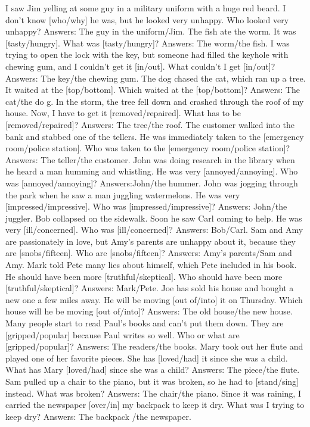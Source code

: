 \begin{foo}
I saw Jim yelling at some guy in a military uniform with a huge red beard. I don't know [who/why] he was, but he looked very unhappy. Who looked very unhappy? Answers: The guy in the uniform/Jim.
The fish ate the worm. It was [tasty/hungry]. What was [tasty/hungry]? Answers: The worm/the  fish.
I was trying to open the lock with the key, but someone had filled the keyhole with chewing gum, and I couldn't get it [in/out]. What couldn't I get [in/out]? Answers: The key/the chewing gum.
The dog chased the cat, which ran up a tree. It waited at the [top/bottom]. Which waited at the [top/bottom]? Answers: The cat/the do g.
In the storm, the tree fell down and crashed through the roof of my house. Now, I have to get it [removed/repaired]. What has to be [removed/repaired]? Answers: The  tree/the roof.
The customer walked into the bank and stabbed one of the tellers. He was immediately taken to the [emergency room/police station]. Who was taken to the [emergency room/police station]? Answers: The teller/the customer.
John was doing research in the library when he heard a man humming and whistling. He was very [annoyed/annoying]. Who was [annoyed/annoying]? Answers:John/the hummer.
John was jogging through the park when he saw a man juggling watermelons. He was very [impressed/impressive]. Who was [impressed/impressive]? Answers: John/the juggler.
Bob collapsed on the sidewalk. Soon he saw Carl coming to help. He was very [ill/concerned]. Who was [ill/concerned]? Answers: Bob/Carl.
Sam and Amy are passionately in love, but Amy's parents are unhappy about it, because they are [snobs/fifteen]. Who are [snobs/fifteen]? Answers: Amy's parents/Sam and Amy.
Mark told Pete many lies about himself, which Pete included in his book. He should have been more [truthful/skeptical]. Who should have been more [truthful/skeptical]? Answers: Mark/Pete.
Joe has sold his house and bought a new one a few miles away. He will be moving [out of/into] it on Thursday. Which house will he be moving [out of/into]? Answers: The old house/the new house.
Many people start to read Paul's books and can't put them down. They are [gripped/popular] because Paul writes so well. Who or what are [gripped/popular]? Answers: The readers/the books.
Mary took out her flute and played one of her favorite pieces. She has [loved/had] it since she was a child. What has Mary [loved/had] since she was a child? Answers: The piece/the flute.
Sam pulled up a chair to the piano, but it was broken, so he had to [stand/sing] instead. What was broken? Answers: The chair/the piano.
Since it was raining, I carried the newspaper [over/in] my backpack to keep it dry. What was I trying to keep dry? Answers: The backpack /the newspaper.

\end{foo}
